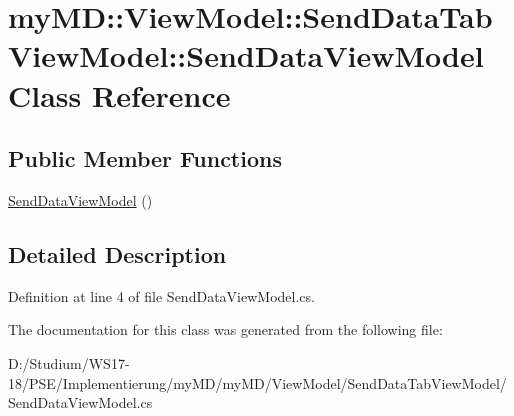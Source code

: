 \hypertarget{classmy_m_d_1_1_view_model_1_1_send_data_tab_view_model_1_1_send_data_view_model}{
\section{my\-MD::View\-Model::Send\-Data\-Tab\-View\-Model::Send\-Data\-View\-Model Class Reference}
\label{d4/dc0/classmy_m_d_1_1_view_model_1_1_send_data_tab_view_model_1_1_send_data_view_model}
}
\subsection*{Public Member Functions}
\begin{CompactItemize}
\item 
\hypertarget{classmy_m_d_1_1_view_model_1_1_send_data_tab_view_model_1_1_send_data_view_model_0fe6181bfea3a76618092821d1fc13a1}{
\hyperlink{classmy_m_d_1_1_view_model_1_1_send_data_tab_view_model_1_1_send_data_view_model_0fe6181bfea3a76618092821d1fc13a1}{Send\-Data\-View\-Model} ()}
\label{d4/dc0/classmy_m_d_1_1_view_model_1_1_send_data_tab_view_model_1_1_send_data_view_model_0fe6181bfea3a76618092821d1fc13a1}

\end{CompactItemize}


\subsection{Detailed Description}




Definition at line 4 of file Send\-Data\-View\-Model.cs.

The documentation for this class was generated from the following file:\begin{CompactItemize}
\item 
D:/Studium/WS17-18/PSE/Implementierung/my\-MD/my\-MD/View\-Model/Send\-Data\-Tab\-View\-Model/Send\-Data\-View\-Model.cs\end{CompactItemize}
